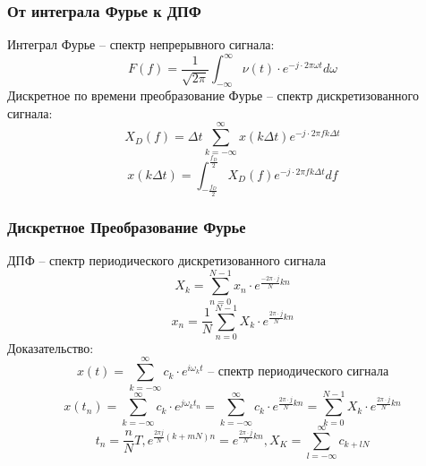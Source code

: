 \documentclass[utf8]{beamer}
\begin{document}
\begin{frame}
\frametitle{От интеграла Фурье к ДПФ}
Интеграл Фурье --  спектр непрерывного сигнала:
$$
F(f) = \frac{1}{\sqrt{2 \pi}}\int_{-\infty}^{\infty}\nu(t)\cdot e^{-j\cdot 2\pi \omega t}d\omega
$$
Дискретное по времени преобразование Фурье -- спектр дискретизованного сигнала:
$$
X_D(f) = \Delta t \sum_{k=-\infty}^{\infty}x(k\Delta t) e ^{-j \cdot 2 \pi f k \Delta t}
$$
$$
x(k\Delta t) = \int_{-\frac{f_D}{2}}^{\frac{f_D}{2}}X_D(f) e ^{-j \cdot 2 \pi f k \Delta t} df
$$
\end{frame}
\begin{frame}
\frametitle{Дискретное Преобразование Фурье}
ДПФ -- спектр периодического дискретизованного сигнала
$$
X_k = \sum_{n=0}^{N-1}x_n \cdot e^{\frac{-2\pi \cdot j}{N}k n}
$$
$$
x_n = \frac{1}{N}\sum_{n=0}^{N-1}X_k\cdot e^{\frac{2\pi \cdot j}{N}k n}
$$
Доказательство:
$$
x(t) = \sum_{k=-\infty}^{\infty}c_k \cdot e^{i \omega_k t} \textrm{ -- спектр периодического сигнала}
$$
$$
x(t_n) = \sum_{k=-\infty}^{\infty}c_k \cdot e^{j \omega_k t_n} = \sum_{k=-\infty}^{\infty}c_k \cdot e^{\frac{2\pi \cdot j}{N}k n} = 
 \sum_{k=0}^{N-1}X_k \cdot e^{\frac{2\pi \cdot j}{N}k n}
$$
$$
t_n = \frac{n}{N}T,
e^{\frac{2\pi j}{N} (k + mN)n} = e^{\frac{2\pi \cdot j}{N}k n},
X_K = \sum_{l = -\infty}^{\infty}c_{k+lN}
$$
\end{frame}
\end{document}
